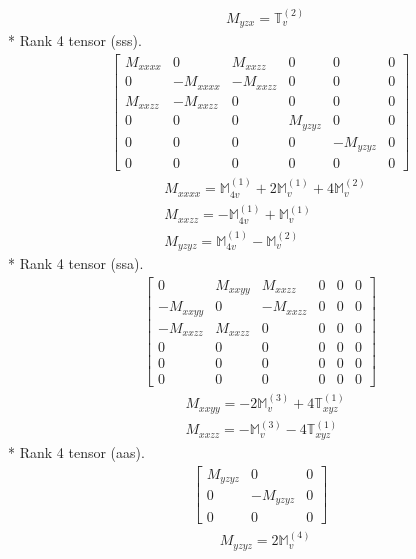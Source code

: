 \documentclass[fleqn,8pt,landscape]{jsarticle}
\begin{document}
\begin{align*}
& M_{yzx} = \mathbb{T}_{v}^{(2)}
\end{align*}
* Rank 4 tensor (sss).
\begin{align*}
\begin{bmatrix} M_{xxxx} & 0 & M_{xxzz} & 0 & 0 & 0 \\ 0 & - M_{xxxx} & - M_{xxzz} & 0 & 0 & 0 \\ M_{xxzz} & - M_{xxzz} & 0 & 0 & 0 & 0 \\ 0 & 0 & 0 & M_{yzyz} & 0 & 0 \\ 0 & 0 & 0 & 0 & - M_{yzyz} & 0 \\ 0 & 0 & 0 & 0 & 0 & 0 \end{bmatrix}
\end{align*}
\begin{align*}
& M_{xxxx} = \mathbb{M}_{4v}^{(1)} + 2 \mathbb{M}_{v}^{(1)} + 4 \mathbb{M}_{v}^{(2)} \\
& M_{xxzz} = - \mathbb{M}_{4v}^{(1)} + \mathbb{M}_{v}^{(1)} \\
& M_{yzyz} = \mathbb{M}_{4v}^{(1)} - \mathbb{M}_{v}^{(2)}
\end{align*}
* Rank 4 tensor (ssa).
\begin{align*}
\begin{bmatrix} 0 & M_{xxyy} & M_{xxzz} & 0 & 0 & 0 \\ - M_{xxyy} & 0 & - M_{xxzz} & 0 & 0 & 0 \\ - M_{xxzz} & M_{xxzz} & 0 & 0 & 0 & 0 \\ 0 & 0 & 0 & 0 & 0 & 0 \\ 0 & 0 & 0 & 0 & 0 & 0 \\ 0 & 0 & 0 & 0 & 0 & 0 \end{bmatrix}
\end{align*}
\begin{align*}
& M_{xxyy} = - 2 \mathbb{M}_{v}^{(3)} + 4 \mathbb{T}_{xyz}^{(1)} \\
& M_{xxzz} = - \mathbb{M}_{v}^{(3)} - 4 \mathbb{T}_{xyz}^{(1)}
\end{align*}
* Rank 4 tensor (aas).
\begin{align*}
\begin{bmatrix} M_{yzyz} & 0 & 0 \\ 0 & - M_{yzyz} & 0 \\ 0 & 0 & 0 \end{bmatrix}
\end{align*}
\begin{align*}
& M_{yzyz} = 2 \mathbb{M}_{v}^{(4)}
\end{align*}
\end{document}
